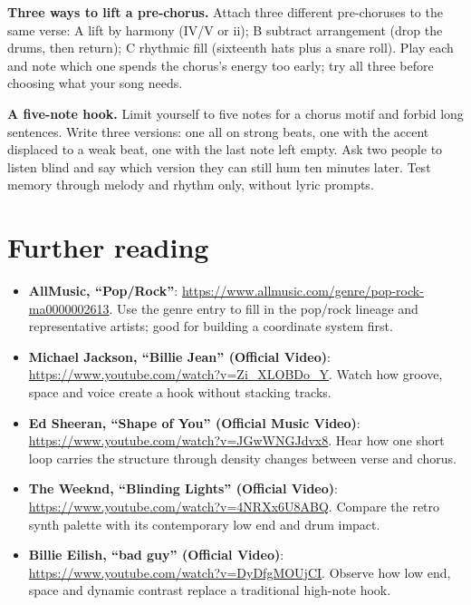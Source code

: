 \begin{exercise}
\textbf{Three ways to lift a pre-chorus.} Attach three different pre-choruses to the same verse: A lift by harmony (IV/V or ii); B subtract arrangement (drop the drums, then return); C rhythmic fill (sixteenth hats plus a snare roll). Play each and note which one spends the chorus's energy too early; try all three before choosing what your song needs.
\end{exercise}

\begin{exercise}
\textbf{A five-note hook.} Limit yourself to five notes for a chorus motif and forbid long sentences. Write three versions: one all on strong beats, one with the accent displaced to a weak beat, one with the last note left empty. Ask two people to listen blind and say which version they can still hum ten minutes later. Test memory through melody and rhythm only, without lyric prompts.
\end{exercise}

\section{Further reading}
\label{sec:pop-reading}

\begin{sloppypar}
\begin{itemize}
\item \textbf{AllMusic, ``Pop/Rock''}: \url{https://www.allmusic.com/genre/pop-rock-ma0000002613}. Use the genre entry to fill in the pop/rock lineage and representative artists; good for building a coordinate system first.
\item \textbf{Michael Jackson, ``Billie Jean'' (Official Video)}: \url{https://www.youtube.com/watch?v=Zi_XLOBDo_Y}. Watch how groove, space and voice create a hook without stacking tracks.
\item \textbf{Ed Sheeran, ``Shape of You'' (Official Music Video)}: \url{https://www.youtube.com/watch?v=JGwWNGJdvx8}. Hear how one short loop carries the structure through density changes between verse and chorus.
\item \textbf{The Weeknd, ``Blinding Lights'' (Official Video)}: \url{https://www.youtube.com/watch?v=4NRXx6U8ABQ}. Compare the retro synth palette with its contemporary low end and drum impact.
\item \textbf{Billie Eilish, ``bad guy'' (Official Video)}: \url{https://www.youtube.com/watch?v=DyDfgMOUjCI}. Observe how low end, space and dynamic contrast replace a traditional high-note hook.
\end{itemize}
\end{sloppypar}

